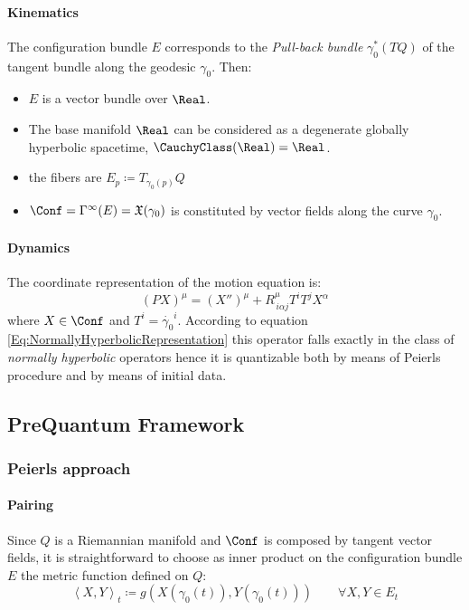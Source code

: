 \documentclass[Main]{subfiles}
\begin{document}
			\paragraph{Kinematics}	
			The configuration bundle $E$ corresponds to the \emph{Pull-back bundle} $\gamma_0^*(TQ)$ of the tangent bundle along the geodesic $\gamma_0$.
			Then:
			\begin{itemize}
				\item $E$ is a vector bundle over $\Real$.
				\item The base manifold $\Real$ can be considered as a degenerate globally hyperbolic spacetime, $\CauchyClass(\Real) = \Real$.
				\item the fibers are $E_p \coloneqq T_{\gamma_0(p)}Q$
				\item $\Conf = \Gamma^\infty(E) = \mathfrak{X}(\gamma_0)$ is constituted by vector fields along the curve $\gamma_0$.
			\end{itemize}
			
			\paragraph{Dynamics}
				The coordinate representation of the motion equation is:
				\begin{displaymath}
					\left( P X \right)^\mu = (X'')^\mu + R^\mu_{\, i \alpha j } T^i T^j X^\alpha
				\end{displaymath}
				where $X\in \Conf$ and $T^i = \dot{\gamma_0}^i$.
				According to equation \ref{Eq:NormallyHyperbolicRepresentation} this operator falls exactly in the class of \emph{normally hyperbolic} operators hence it is quantizable both by  means of Peierls procedure and by means of initial data.
		
		\subsection{PreQuantum Framework}
		\subsubsection{Peierls approach}
			\paragraph{Pairing}
				Since $Q$ is a Riemannian manifold and $\Conf$ is composed by tangent vector fields, it is straightforward to choose as inner product on the configuration bundle $E$ the metric function defined on $Q$:
				\begin{equation}
					\left\langle X,Y \right\rangle_t \coloneqq g\left( X\left(\gamma_0(t) \right),Y\left(\gamma_0(t) \right)\right)
					\qquad \forall X,Y \in E_t
				\end{equation}
				
\end{document}
